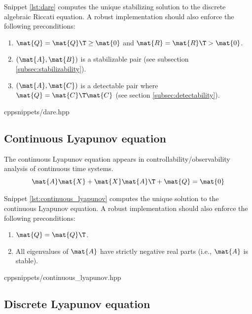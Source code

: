 Snippet \ref{lst:dare} computes the unique stabilizing solution to the
discrete algebraic Riccati equation. A robust implementation should also
enforce the following preconditions:
\begin{enumerate}
  \item $\mat{Q} = \mat{Q}\T \geq \mat{0}$ and $\mat{R} = \mat{R}\T > \mat{0}$.
  \item $(\mat{A}, \mat{B})$ is a stabilizable pair (see subsection
    \ref{subsec:stabilizability}).
  \item $(\mat{A}, \mat{C})$ is a detectable pair where
    $\mat{Q} = \mat{C}\T\mat{C}$ (see section \ref{subsec:detectability}).
\end{enumerate}
\begin{coderemote}{cpp}{snippets/dare.hpp}
  \caption{Discrete algebraic Riccati equation solver in C++}
  \label{lst:dare}
\end{coderemote}

\subsection{Continuous Lyapunov equation}

The continuous Lyapunov equation appears in controllability/observability
analysis of continuous time systems.
\begin{equation}
  \mat{A}\mat{X} + \mat{X}\mat{A}\T + \mat{Q} = \mat{0}
\end{equation}

Snippet \ref{lst:continuous_lyapunov} computes the unique solution to the
continuous Lyapunov equation. A robust implementation should also enforce the
following preconditions:
\begin{enumerate}
  \item $\mat{Q} = \mat{Q}\T$.
  \item All eigenvalues of $\mat{A}$ have strictly negative real parts (i.e.,
    $\mat{A}$ is stable).
\end{enumerate}
\begin{coderemote}{cpp}{snippets/continuous_lyapunov.hpp}
  \caption{Continuous Lyapunov equation solver in C++}
  \label{lst:continuous_lyapunov}
\end{coderemote}

\subsection{Discrete Lyapunov equation}

